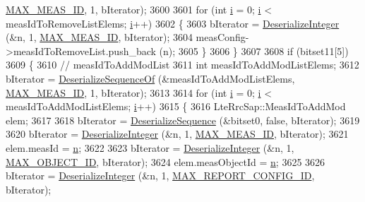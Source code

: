 \begin{DoxyCode}
      \hyperlink{lte-rrc-header_8cc_aa360afec99420ceee80ed487493f6a9d}{MAX\_MEAS\_ID}, 1, bIterator);
3600 
3601       \textcolor{keywordflow}{for} (\textcolor{keywordtype}{int} \hyperlink{bernuolliDistribution_8m_a6f6ccfcf58b31cb6412107d9d5281426}{i} = 0; \hyperlink{bernuolliDistribution_8m_a6f6ccfcf58b31cb6412107d9d5281426}{i} < measIdToRemoveListElems; \hyperlink{bernuolliDistribution_8m_a6f6ccfcf58b31cb6412107d9d5281426}{i}++)
3602         \{
3603           bIterator = \hyperlink{classns3_1_1Asn1Header_a49802c9af30018b078150e866b6ecae2}{DeserializeInteger} (&n, 1, \hyperlink{lte-rrc-header_8cc_aa360afec99420ceee80ed487493f6a9d}{MAX\_MEAS\_ID}, bIterator);
3604           measConfig->measIdToRemoveList.push\_back (n);
3605         \}
3606     \}
3607 
3608   \textcolor{keywordflow}{if} (bitset11[5])
3609     \{
3610       \textcolor{comment}{// measIdToAddModList}
3611       \textcolor{keywordtype}{int} measIdToAddModListElems;
3612       bIterator = \hyperlink{classns3_1_1Asn1Header_a1a7245e05b482df8abade0a060bd0ecc}{DeserializeSequenceOf} (&measIdToAddModListElems, 
      \hyperlink{lte-rrc-header_8cc_aa360afec99420ceee80ed487493f6a9d}{MAX\_MEAS\_ID}, 1, bIterator);
3613 
3614       \textcolor{keywordflow}{for} (\textcolor{keywordtype}{int} \hyperlink{bernuolliDistribution_8m_a6f6ccfcf58b31cb6412107d9d5281426}{i} = 0; \hyperlink{bernuolliDistribution_8m_a6f6ccfcf58b31cb6412107d9d5281426}{i} < measIdToAddModListElems; \hyperlink{bernuolliDistribution_8m_a6f6ccfcf58b31cb6412107d9d5281426}{i}++)
3615         \{
3616           LteRrcSap::MeasIdToAddMod elem;
3617 
3618           bIterator = \hyperlink{classns3_1_1Asn1Header_a58c68bb97ba3fe2e8fcdd7c208d672b2}{DeserializeSequence} (&bitset0, \textcolor{keyword}{false}, bIterator);
3619 
3620           bIterator = \hyperlink{classns3_1_1Asn1Header_a49802c9af30018b078150e866b6ecae2}{DeserializeInteger} (&n, 1, \hyperlink{lte-rrc-header_8cc_aa360afec99420ceee80ed487493f6a9d}{MAX\_MEAS\_ID}, bIterator);
3621           elem.measId = \hyperlink{namespacesample-rng-plot_aeb5ee5c431e338ef39b7ac5431242e1d}{n};
3622 
3623           bIterator = \hyperlink{classns3_1_1Asn1Header_a49802c9af30018b078150e866b6ecae2}{DeserializeInteger} (&n, 1, \hyperlink{lte-rrc-header_8cc_ab2de695aee029784062779621283535d}{MAX\_OBJECT\_ID}, bIterator);
3624           elem.measObjectId = \hyperlink{namespacesample-rng-plot_aeb5ee5c431e338ef39b7ac5431242e1d}{n};
3625 
3626           bIterator = \hyperlink{classns3_1_1Asn1Header_a49802c9af30018b078150e866b6ecae2}{DeserializeInteger} (&n, 1, 
      \hyperlink{lte-rrc-header_8cc_af8a3b931c04f0fa0e31e7c8480ba0bb6}{MAX\_REPORT\_CONFIG\_ID}, bIterator);

\end{DoxyCode}
